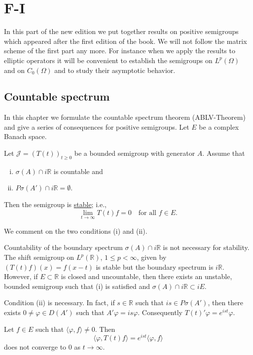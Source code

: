 \chapter{F-I}

In this part of the new edition we put together results on positive semigroups which appeared after the first edition of the book. 
We will not follow the matrix scheme of the first part any more. 
For instance when we apply the results to elliptic operators it will be convenient to establish the semigroups on $L^{p}(\Omega)$ and on $C_{0}(\Omega)$ and to study their asymptotic behavior.

\section{Countable spectrum}

In this chapter we formulate the countable spectrum theorem (ABLV-Theorem) and give a series of consequences for positive semigroups.
Let $E$ be a complex Banach space.

\begin{theorem}
Let $\mathcal{J} = (T(t))_{t \geq 0}$ be a bounded semigroup with generator $A$. Assume that
\begin{enumerate}[(i)]
\item $\sigma(A) \cap i\mathbb{R}$ is countable and
\item $P\sigma(A') \cap i\mathbb{R} = \emptyset$.
\end{enumerate}

Then the semigroup is \underline{stable}; i.e.,
\begin{equation*}
\lim_{t \to \infty} T(t)f = 0 \quad \text{for all } f \in E.
\end{equation*}
\end{theorem}

We comment on the two conditions (i) and (ii).

Countability of the boundary spectrum $\sigma(A) \cap i\mathbb{R}$ is not necessary for stability. 
The shift semigroup on $L^p(\mathbb{R})$, $1 \leq p < \infty$, given by $(T(t)f)(x) = f(x-t)$ is stable but the boundary spectrum is $i\mathbb{R}$. 
However, if $E \subset \mathbb{R}$ is closed and uncountable, then there exists an unstable, bounded semigroup such that (i) is satisfied and $\sigma(A) \cap i\mathbb{R} \subset iE$.

Condition (ii) is necessary. In fact, if $s \in \mathbb{R}$ such that $is \in P\sigma(A')$, then there exists $0 \neq \varphi \in D(A')$ such that $A'\varphi = is\varphi$. Consequently $T(t)'\varphi = e^{ist}\varphi$.

Let $f \in E$ such that $\langle \varphi, f \rangle \neq 0$. Then 
\begin{equation*}
\langle \varphi, T(t)f \rangle = e^{ist} \langle \varphi, f \rangle
\end{equation*}
does not converge to $0$ as $t \to \infty$.
